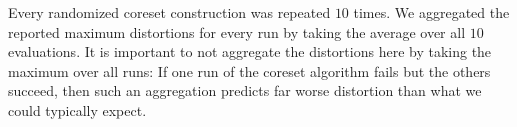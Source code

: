 Every randomized coreset construction was repeated $10$ times. We aggregated the reported maximum distortions for every run by taking the average over all $10$ evaluations. 
It is important to not aggregate the distortions here by taking the maximum over all runs: If one run of the coreset algorithm fails but the others succeed, then such an aggregation predicts far worse distortion than what we could typically expect.







